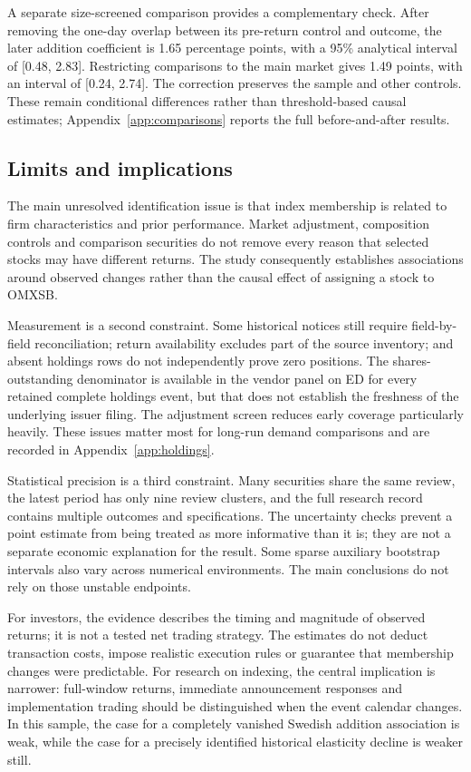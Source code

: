 A separate size-screened comparison provides a complementary check. After removing the one-day overlap between its pre-return control and outcome, the later addition coefficient is 1.65 percentage points, with a 95\% analytical interval of [0.48, 2.83]. Restricting comparisons to the main market gives 1.49 points, with an interval of [0.24, 2.74]. The correction preserves the sample and other controls. These remain conditional differences rather than threshold-based causal estimates; Appendix~\ref{app:comparisons} reports the full before-and-after results.

\subsection{Limits and implications}

The main unresolved identification issue is that index membership is related to firm characteristics and prior performance. Market adjustment, composition controls and comparison securities do not remove every reason that selected stocks may have different returns. The study consequently establishes associations around observed changes rather than the causal effect of assigning a stock to OMXSB.

Measurement is a second constraint. Some historical notices still require field-by-field reconciliation; return availability excludes part of the source inventory; and absent holdings rows do not independently prove zero positions. The shares-outstanding denominator is available in the vendor panel on ED for every retained complete holdings event, but that does not establish the freshness of the underlying issuer filing. The adjustment screen reduces early coverage particularly heavily. These issues matter most for long-run demand comparisons and are recorded in Appendix~\ref{app:holdings}.

Statistical precision is a third constraint. Many securities share the same review, the latest period has only nine review clusters, and the full research record contains multiple outcomes and specifications. The uncertainty checks prevent a point estimate from being treated as more informative than it is; they are not a separate economic explanation for the result. Some sparse auxiliary bootstrap intervals also vary across numerical environments. The main conclusions do not rely on those unstable endpoints.

For investors, the evidence describes the timing and magnitude of observed returns; it is not a tested net trading strategy. The estimates do not deduct transaction costs, impose realistic execution rules or guarantee that membership changes were predictable. For research on indexing, the central implication is narrower: full-window returns, immediate announcement responses and implementation trading should be distinguished when the event calendar changes. In this sample, the case for a completely vanished Swedish addition association is weak, while the case for a precisely identified historical elasticity decline is weaker still.
\FloatBarrier
